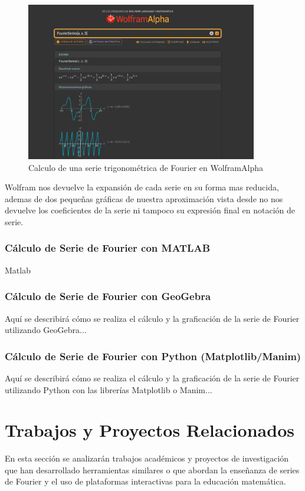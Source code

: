\begin{figure}[H]
	\centering
	\includegraphics[width=0.9\textwidth]{img/chapter02/wolfram_complex_series.png}
	\caption{Calculo de una serie trigonométrica de Fourier en WolframAlpha}
	\label{fig:wolfram-exp-series}  %
\end{figure}
Wolfram nos devuelve la expansión de cada serie en su forma mas reducida, ademas de dos pequeñas gráficas de nuestra aproximación vista desde  no nos devuelve los coeficientes de la serie ni tampoco su expresión final en notación de serie.

\subsubsection{Cálculo de Serie de Fourier con MATLAB}
Matlab 

\subsubsection{Cálculo de Serie de Fourier con GeoGebra}

Aquí se describirá cómo se realiza el cálculo y la graficación de la serie de Fourier utilizando GeoGebra...

\subsubsection{Cálculo de Serie de Fourier con Python (Matplotlib/Manim)}

Aquí se describirá cómo se realiza el cálculo y la graficación de la serie de Fourier utilizando Python con las librerías Matplotlib o Manim...



\section{Trabajos y Proyectos Relacionados}
En esta sección se analizarán trabajos académicos y proyectos de investigación que han desarrollado herramientas similares o que abordan la enseñanza de series de Fourier y el uso de plataformas interactivas para la educación matemática. 

